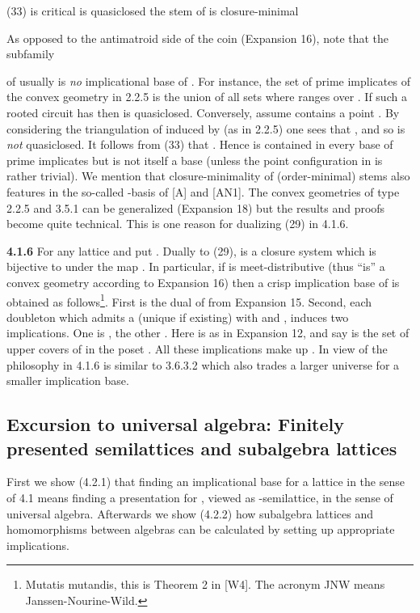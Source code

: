 \documentclass[11pt]{article}
\begin{document}
(33) \quad  is critical  is quasiclosed  the stem  of  is closure-minimal

As opposed to the antimatroid side of the coin (Expansion 16), note that the subfamily

of  usually is {\it no} implicational base of . For instance, the set  of prime implicates of the convex geometry  in 2.2.5 is the union of all sets  where  ranges over . If such a rooted circuit  has  then  is quasiclosed. Conversely, assume  contains a point . By considering the triangulation of  induced by  (as in 2.2.5) one sees that , and so  is {\it not} quasiclosed. It follows from (33) that . Hence  is contained in every base of prime implicates but is not itself a base (unless the point configuration in  is rather trivial). 
We mention that closure-minimality of (order-minimal) stems also features in the so-called -basis of [A] and [AN1]. The convex geometries of type 2.2.5 and 3.5.1 can be generalized (Expansion 18) but the results and proofs become quite technical. This is one reason for dualizing (29) in 4.1.6. 



{\bf 4.1.6} For any lattice  and  put . Dually to (29),  is a closure system which is bijective to  under the map . In particular, if  is meet-distributive (thus  ``is'' a convex geometry according to Expansion 16) then a crisp implication base  of  is obtained as follows\footnote{Mutatis mutandis, this is Theorem 2 in [W4]. The acronym JNW means Janssen-Nourine-Wild.}. First  is the dual of  from Expansion 15. Second, each doubleton  which admits a (unique if existing)  with  and , induces two implications. One is , the other . Here  is as in Expansion 12, and say  is the set of upper covers of  in the poset . All these implications make up . In view of  the philosophy in 4.1.6 is similar to 3.6.3.2 which also trades a larger universe for a smaller implication base.





\subsection{Excursion to universal algebra: Finitely presented semilattices and subalgebra lattices}
 
First we show (4.2.1) that finding an implicational base for a lattice  in the sense of 4.1  means finding a presentation for , viewed as  -semilattice, in the sense of universal algebra. Afterwards we show (4.2.2) how subalgebra lattices and homomorphisms between algebras can be calculated by setting up appropriate implications. 
\end{document}
